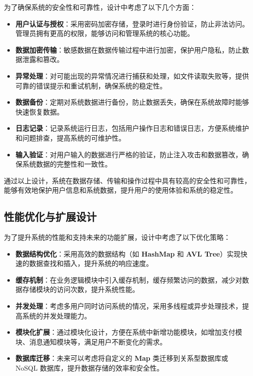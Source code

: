 \documentclass[UTF8, a4paper,12pt]{ctexart}
\begin{document}
为了确保系统的安全性和可靠性，设计中考虑了以下几个方面：

\begin{itemize}
    \item \textbf{用户认证与授权}：采用密码加密存储，登录时进行身份验证，防止非法访问。管理员拥有更高的权限，能够访问和管理系统的核心功能。
    \item \textbf{数据加密传输}：敏感数据在数据传输过程中进行加密，保护用户隐私，防止数据泄露和篡改。
    \item \textbf{异常处理}：对可能出现的异常情况进行捕获和处理，如文件读取失败等，提供可靠的错误提示和重试机制，确保系统的稳定性。
    \item \textbf{数据备份}：定期对系统数据进行备份，防止数据丢失，确保在系统故障时能够快速恢复数据。
    \item \textbf{日志记录}：记录系统运行日志，包括用户操作日志和错误日志，方便系统维护和问题排查，提高系统的可维护性。
    \item \textbf{输入验证}：对用户输入的数据进行严格的验证，防止注入攻击和数据篡改，确保系统数据的完整性和一致性。
\end{itemize}

通过以上设计，系统在数据存储、传输和操作过程中具有较高的安全性和可靠性，能够有效地保护用户信息和系统数据，提升用户的使用体验和系统的稳定性。

\subsection{性能优化与扩展设计}

为了提升系统的性能和支持未来的功能扩展，设计中考虑了以下优化策略：

\begin{itemize}
    \item \textbf{数据结构优化}：采用高效的数据结构（如 \textbf{HashMap} 和 \textbf{AVL Tree}）实现快速的数据查找和插入，提升系统的响应速度。
    \item \textbf{缓存机制}：在业务逻辑模块中引入缓存机制，缓存频繁访问的数据，减少对数据存储模块的访问次数，提升系统性能。
    \item \textbf{并发处理}：考虑多用户同时访问系统的情况，采用多线程或异步处理技术，提高系统的并发处理能力。
    \item \textbf{模块化扩展}：通过模块化设计，方便在系统中新增功能模块，如增加支付模块、消息通知模块等，满足用户不断变化的需求。
    \item \textbf{数据库迁移}：未来可以考虑将自定义的 \textbf{Map} 类迁移到关系型数据库或 NoSQL 数据库，提升数据存储的效率和安全性。
\end{itemize}
\newpage
\end{document}

